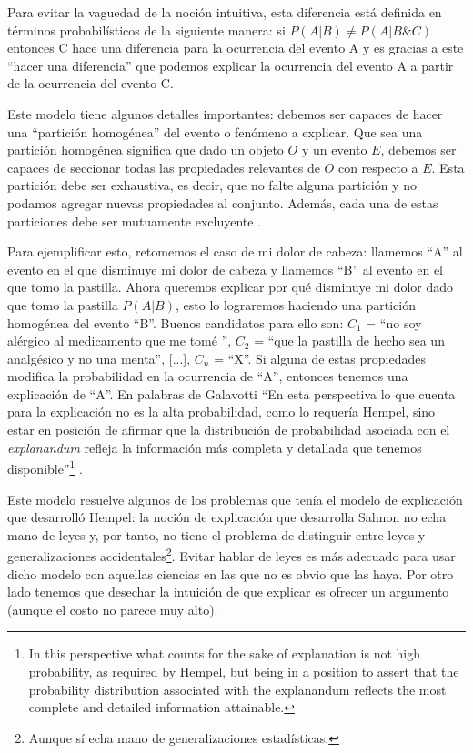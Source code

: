 Para evitar la vaguedad de la noción intuitiva, esta diferencia está definida en términos probabilísticos de la siguiente manera: si $P(A|B) \neq P(A|B\&C)$ entonces C hace una diferencia para la ocurrencia del evento A y es gracias a este ``hacer una diferencia'' que podemos explicar la ocurrencia del evento A a partir de la ocurrencia del evento C.

Este modelo tiene algunos detalles importantes: debemos ser capaces de hacer una ``partición homogénea'' del evento o fenómeno a explicar. Que sea una partición homogénea significa que dado un objeto $O$ y un evento $E$, debemos ser capaces de seccionar todas las propiedades relevantes de $O$ con respecto a $E$. Esta partición debe ser exhaustiva, es decir, que no falte alguna partición y no podamos agregar nuevas propiedades al conjunto. Además, cada una de estas particiones debe ser mutuamente excluyente \cite{Woodward2019}.

Para ejemplificar esto, retomemos el caso de mi dolor de cabeza: llamemos ``A'' al evento en el que disminuye mi dolor de cabeza y llamemos ``B'' al evento en el que tomo la pastilla. Ahora queremos explicar por qué disminuye mi dolor dado que tomo la pastilla $P(A|B)$, esto lo lograremos haciendo una partición homogénea del evento ``B''. Buenos candidatos para ello son: $C_{1}$ = ``no soy alérgico al medicamento que me tomé '', $C_{2}$ = ``que la pastilla de hecho sea un analgésico y no una menta'', [...], $C_{n}$ = ``X''. Si alguna de estas propiedades modifica la probabilidad en la ocurrencia de ``A'', entonces tenemos una explicación de ``A''. En palabras de Galavotti ``En esta perspectiva lo que cuenta para la explicación no es la alta probabilidad, como lo requería Hempel, sino estar en posición de afirmar que la distribución de probabilidad asociada con el \textit{explanandum} refleja la información más completa y detallada que tenemos disponible''\footnote{In this perspective what counts for the sake of explanation is not high probability, as required by Hempel, but being in a position to assert that the probability distribution associated with the explanandum reflects the most complete and detailed information attainable.} \cite{Galavotti2018}.

Este modelo resuelve algunos de los problemas que tenía el modelo de explicación que desarrolló Hempel: la noción de explicación que desarrolla Salmon no echa mano de leyes y, por tanto, no tiene el problema de distinguir entre leyes y generalizaciones accidentales\footnote{Aunque sí echa mano de generalizaciones estadísticas.}. Evitar hablar de leyes es más adecuado para usar dicho modelo con aquellas ciencias en las que no es obvio que las haya. Por otro lado tenemos que desechar la intuición de que explicar es ofrecer un argumento (aunque el costo no parece muy alto).

